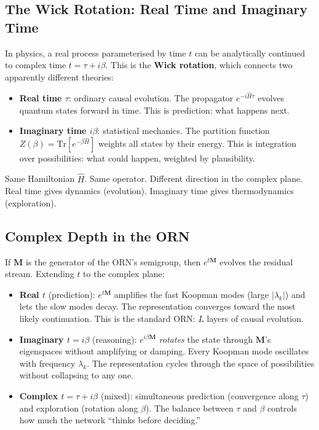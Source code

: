 \documentclass[11pt, a4paper]{article}
\newcommand{\M}{\mathbf{M}}
\theoremstyle{plain}
\theoremstyle{remark}
\begin{document}
\subsection{The Wick Rotation: Real Time and Imaginary Time}

In physics, a real process parameterised by time $t$ can be analytically continued to complex time $t = \tau + i\beta$.
This is the \textbf{Wick rotation}, which connects two apparently different theories:
\begin{itemize}[nosep]
    \item \textbf{Real time $\tau$}: ordinary causal evolution.  The propagator $e^{-i\hat{H}\tau}$ evolves quantum states forward in time.  This is prediction: what happens next.
    \item \textbf{Imaginary time $i\beta$}: statistical mechanics.  The partition function $Z(\beta) = \text{Tr}[e^{-\beta \hat{H}}]$ weights all states by their energy.  This is integration over possibilities: what could happen, weighted by plausibility.
\end{itemize}

Same Hamiltonian $\hat{H}$.  Same operator.  Different direction in the complex plane.  Real time gives dynamics (evolution).  Imaginary time gives thermodynamics (exploration).

\subsection{Complex Depth in the ORN}

If $\M$ is the generator of the ORN's semigroup, then $e^{t\M}$ evolves the residual stream.
Extending $t$ to the complex plane:
\begin{itemize}[nosep]
    \item \textbf{Real $t$} (prediction): $e^{t\M}$ amplifies the fast Koopman modes (large $|\lambda_k|$) and lets the slow modes decay.  The representation converges toward the most likely continuation.  This is the standard ORN: $L$ layers of causal evolution.
    \item \textbf{Imaginary $t = i\beta$} (reasoning): $e^{i\beta\M}$ \emph{rotates} the state through $\M$'s eigenspaces without amplifying or damping.  Every Koopman mode oscillates with frequency $\lambda_k$.  The representation cycles through the space of possibilities without collapsing to any one.
    \item \textbf{Complex $t = \tau + i\beta$} (mixed): simultaneous prediction (convergence along $\tau$) and exploration (rotation along $\beta$).  The balance between $\tau$ and $\beta$ controls how much the network ``thinks before deciding.''
\end{itemize}
\end{document}
